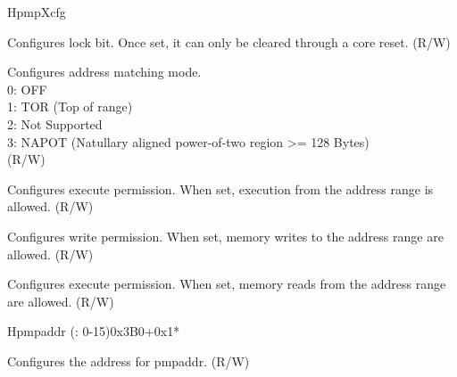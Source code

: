 \begin{register}{H}{pmpXcfg}{}
\label{regdesc:pmpXcfg}%
%
%
%
%
%
%
\regnewline%
\begin{regdesc}
\begin{reglist}
\label{fielddesc:pmpXcfgL}\item [L] Configures lock bit. Once set, it can only be cleared through a core reset. (R/W) 
\label{fielddesc:pmpXcfgA}\item [A] Configures address matching mode.\\
0: OFF \\
1: TOR (Top of range) \\
2: Not Supported \\
3: NAPOT (Natullary aligned power-of-two region >= 128 Bytes)\\
(R/W)
\label{fielddesc:pmpXcfgX}\item [X] Configures execute permission. When set, execution from the address range is allowed. (R/W)
\label{fielddesc:pmpXcfgW}\item [W] Configures write permission. When set, memory writes to the address range are allowed. (R/W)
\label{fielddesc:pmpXcfgR}\item [R] Configures execute permission. When set, memory reads from the address range are allowed. (R/W)
\end{reglist}
\end{regdesc}
\end{register}

\begin{register}{H}{pmpaddr (: 0-15)}{0x3B0+0x1*}\label{regdesc:pmpaddrN}
%
\regnewline%
\begin{regdesc}\begin{reglist}
\label{fielddesc:ADDR}\item [address] Configures the address for pmpaddr. (R/W)
\end{reglist}\end{regdesc}
\end{register}

